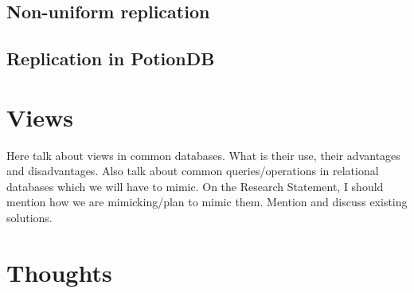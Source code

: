 \subsection{Non-uniform replication}

\subsection{Replication in PotionDB}


\section{Views}

Here talk about views in common databases. What is their use, their advantages and disadvantages. Also talk about common queries/operations in relational databases which we will have to mimic. On the Research Statement, I should mention how we are mimicking/plan to mimic them.
Mention and discuss existing solutions.







\section{Thoughts}

